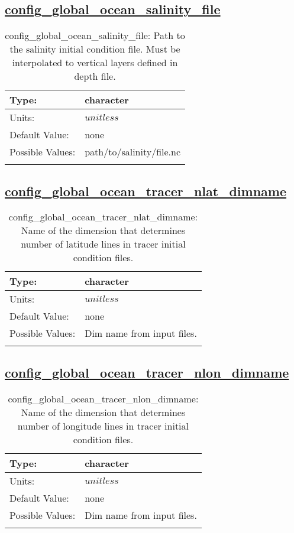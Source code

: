 \subsection[config\_global\_ocean\_salinity\_file]{\hyperref[sec:nm_tab_global_ocean]{config\_global\_ocean\_salinity\_file}}
\label{subsec:nm_sec_config_global_ocean_salinity_file}
\begin{center}
\begin{longtable}{| p{2.0in} || p{4.0in} |}
    \hline
    Type: & character \\
    \hline
    Units: & $unitless$ \\
    \hline
    Default Value: & none \\
    \hline
    Possible Values: & path/to/salinity/file.nc \\
    \hline
    \caption{config\_global\_ocean\_salinity\_file: Path to the salinity initial condition file. Must be interpolated to vertical layers defined in depth file.}
\end{longtable}
\end{center}
\subsection[config\_global\_ocean\_tracer\_nlat\_dimname]{\hyperref[sec:nm_tab_global_ocean]{config\_global\_ocean\_tracer\_nlat\_dimname}}
\label{subsec:nm_sec_config_global_ocean_tracer_nlat_dimname}
\begin{center}
\begin{longtable}{| p{2.0in} || p{4.0in} |}
    \hline
    Type: & character \\
    \hline
    Units: & $unitless$ \\
    \hline
    Default Value: & none \\
    \hline
    Possible Values: & Dim name from input files. \\
    \hline
    \caption{config\_global\_ocean\_tracer\_nlat\_dimname: Name of the dimension that determines number of latitude lines in tracer initial condition files.}
\end{longtable}
\end{center}
\subsection[config\_global\_ocean\_tracer\_nlon\_dimname]{\hyperref[sec:nm_tab_global_ocean]{config\_global\_ocean\_tracer\_nlon\_dimname}}
\label{subsec:nm_sec_config_global_ocean_tracer_nlon_dimname}
\begin{center}
\begin{longtable}{| p{2.0in} || p{4.0in} |}
    \hline
    Type: & character \\
    \hline
    Units: & $unitless$ \\
    \hline
    Default Value: & none \\
    \hline
    Possible Values: & Dim name from input files. \\
    \hline
    \caption{config\_global\_ocean\_tracer\_nlon\_dimname: Name of the dimension that determines number of longitude lines in tracer initial condition files.}
\end{longtable}
\end{center}
